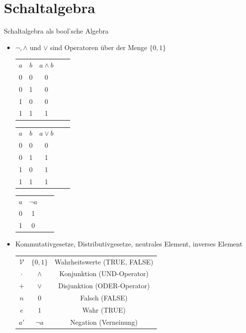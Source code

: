 \documentclass[12pt%
,aspectratio=169%
]{beamer}
\begin{document}
\section{Schaltalgebra}
\begin{frame}{Schaltalgebra als bool'sche Algebra}
\begin{itemize}
	\item $\neg, \land$ und $\lor$ sind Operatoren über der Menge $\{0,1\}$
\begin{center}

\begin{table}[]
\begin{tabular}{|c|c|c|ll}
\cline{1-3}
$a$ & $b$ & $a \land b$ &  &  \\ \cline{1-3}
0 & 0 & 0 &  &  \\ \cline{1-3}
0 & 1 & 0 &  &  \\ \cline{1-3}
1 & 0 & 0 &  &  \\ \cline{1-3}
1 & 1 & 1 &  &  \\ \cline{1-3}
\end{tabular}
%
\begin{tabular}{|c|c|c|ll}
\cline{1-3}
$a$ & $b$ & $a \lor b$ &  &  \\ \cline{1-3}
0 & 0 & 0 &  &  \\ \cline{1-3}
0 & 1 & 1 &  &  \\ \cline{1-3}
1 & 0 & 1 &  &  \\ \cline{1-3}
1 & 1 & 1 &  &  \\ \cline{1-3}
\end{tabular}
%
\begin{tabular}{|c|c|ll}
\cline{1-2}
$a$ & $\neg a$ &  &  \\ \cline{1-2}
 0 & 1 &   \\ \cline{1-2}
 1 & 0 &   \\ \cline{1-2}
\end{tabular}
\end{table}
\end{center}
	\item Kommutativgesetze, Distributivgesetze, neutrales Element, inverses Element
	\begin{table}[]
	\begin{tabular}{ccc}
$\mathcal{V}$ & $\{0,1\}$ & Wahrheitswerte (TRUE, FALSE) \\
	$\cdot$ & $\land$ & Konjunktion (UND-Operator) \\
	$+$ & $\lor$ & Disjunktion (ODER-Operator) \\
	$n$ & $0$ & Falsch (FALSE)\\
	$e$ & $1$ &  Wahr (TRUE)\\
	$a'$ & $\neg a$ & Negation (Verneinung)\\
\end{tabular}
\end{table}
\end{itemize}
\end{frame}
\end{document}
